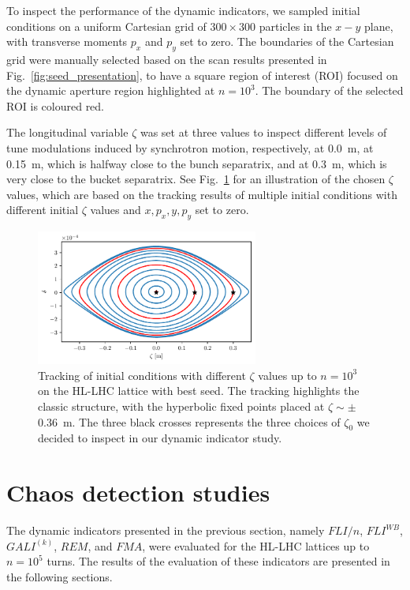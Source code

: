 To inspect the performance of the dynamic indicators, we sampled initial conditions on a uniform Cartesian grid of $300\times300$ particles in the $x-y$ plane, with transverse moments $p_x$ and $p_y$ set to zero. The boundaries of the Cartesian grid were manually selected based on the scan results presented in Fig.~\ref{fig:seed_presentation}, to have a square region of interest (ROI) focused on the dynamic aperture region highlighted at $n=10^3$. The boundary of the selected ROI is coloured red.

The longitudinal variable $\zeta$ was set at three values to inspect different levels of tune modulations induced by synchrotron motion, respectively, at \SI{0.0}{\meter}, at \SI{0.15}{\meter}, which is halfway close to the bunch separatrix, and at \SI{0.3}{\meter}, which is very close to the bucket separatrix. See Fig.~\ref{fig:the_bunch} for an illustration of the chosen $\zeta$ values, which are based on the tracking results of multiple initial conditions with different initial $\zeta$ values and $x, p_x, y, p_y$ set to zero. 

\begin{figure}
    \centering
    \includegraphics[width=0.65\textwidth]{6_lhc_dynamic_indicators/figs/longitudinal.pdf}
    \caption{Tracking of initial conditions with different $\zeta$ values up to $n=10^3$ on the HL-LHC lattice with best seed. The tracking highlights the classic structure, with the hyperbolic fixed points placed at $\zeta \sim \pm$ \SI{0.36}{\meter}. The three black crosses represents the three choices of $\zeta_0$ we decided to inspect in our dynamic indicator study.}
    \label{fig:the_bunch}
\end{figure}

\section{Chaos detection studies} \label{sec:8:results}

The dynamic indicators presented in the previous section, namely $FLI/n$, $FLI^{WB}$, $GALI^{(k)}$, $REM$, and $FMA$, were evaluated for the HL-LHC lattices up to $n=10^5$ turns. The results of the evaluation of these indicators are presented in the following sections.

